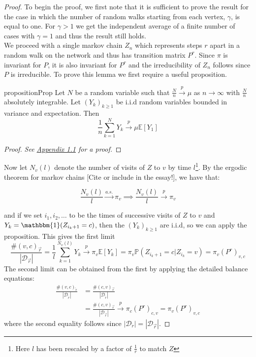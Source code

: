 \documentclass[a4paper]{article}
\renewcommand{\P}{\mathbb P}
\renewcommand{\E}{\mathbb E}
\newcommand{\D}{\mathcal D}
\newcommand{\rar}{\overrightarrow r}
\newcommand{\lar}{\overleftarrow r}
\begin{document}
\begin{proof}
To begin the proof, we first note that it is sufficient to prove the result for the case in which the number
of random walks starting from each vertex, $\gamma$, is equal to one. For $\gamma > 1$ we get the independent average of
a finite number of cases with $\gamma = 1$ and thus the result still holds.\\
We proceed with a single markov chain $Z_n$ which represents steps $r$ apart
in a random walk on the network and thus has transition matrix $P^r$. Since $\pi$ is invariant for $P$, it is also invariant for $P^r$ and the irreducibility of $Z_n$
follows since $P$ is irreducible. To prove this lemma we first require a useful proposition.
\begin{restatable}{proposition}{Prop}
  Let $N$ be a random variable such that $\frac{N}{n} \overset{p}{\longrightarrow} \mu$ as $n \to \infty$ with $\frac{N}{n}$ absolutely integrable. Let $(Y_k)_{k \geq 1}$ be i.i.d random variables bounded in variance and expectation. Then
  \[\frac{1}{n}\sum_{k=1}^N Y_k \overset{p}{\longrightarrow} \mu\E[Y_1]\]
\end{restatable}
\begin{proof}
  \textit{See \hyperref[sec:appendix]{Appendix 1.1} for a proof.}
\end{proof}

Now let $N_v(l)$ denote the number of visits of $Z$ to $v$ by time $l$\footnote{Here $l$ has been rescaled by a factor of $\frac{1}{r}$ to match $Z$}.
By the ergodic theorem for markov chains [Cite or include in the essay!], we have that:

\[\frac{N_v(l)}{l} \overset{a.s.}{\longrightarrow} \pi_v \implies \frac{N_v(l)}{l} \overset{p}{\longrightarrow} \pi_v\]

and if we set $i_1, i_2, \dots$ to be the times of successive visits of $Z$ to $v$ and $Y_k = \mathbbm{1}(Z_{i_k+1} = c)$, then the $(Y_k)_{k \geq 1}$ are i.i.d, so we can apply the proposition.
This gives the first limit
\[\frac{\#(v, c)_{\rar}}{|\D_{\rar}|} = \frac{1}{l}\sum_{k = 1}^{N_v(l)} Y_k \overset{p}{\longrightarrow} \pi_v \E[Y_k] = \pi_v\P(Z_{i_k + 1} = c | Z_{i_k} = v) = \pi_v(P^r)_{v,c}\]
The second limit can be obtained from the first by applying the detailed balance equations:
\begin{align*}
\frac{\#(v, c)_{\lar}}{|\D_{\lar}|} &= \frac{\#(c, v)_{\rar}}{|\D_{\lar}|}\\
&=\frac{\#(c, v)_{\rar}}{|\D_{\rar}|} \overset{p}{\longrightarrow} \pi_c(P^r)_{c,v} = \pi_v (P^r)_{v,c}
\end{align*}
where the second equality follows since $|\D_{\lar}| = |\D_{\rar}|$.
\end{proof}
\end{document}
